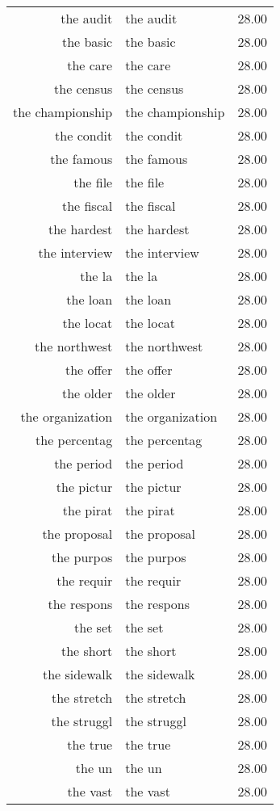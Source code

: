 \begin{table}[ht]
\begin{tabular}{rlr}
  the audit & the audit & 28.00 \\ 
  the basic & the basic & 28.00 \\ 
  the care & the care & 28.00 \\ 
  the census & the census & 28.00 \\ 
  the championship & the championship & 28.00 \\ 
  the condit & the condit & 28.00 \\ 
  the famous & the famous & 28.00 \\ 
  the file & the file & 28.00 \\ 
  the fiscal & the fiscal & 28.00 \\ 
  the hardest & the hardest & 28.00 \\ 
  the interview & the interview & 28.00 \\ 
  the la & the la & 28.00 \\ 
  the loan & the loan & 28.00 \\ 
  the locat & the locat & 28.00 \\ 
  the northwest & the northwest & 28.00 \\ 
  the offer & the offer & 28.00 \\ 
  the older & the older & 28.00 \\ 
  the organization & the organization & 28.00 \\ 
  the percentag & the percentag & 28.00 \\ 
  the period & the period & 28.00 \\ 
  the pictur & the pictur & 28.00 \\ 
  the pirat & the pirat & 28.00 \\ 
  the proposal & the proposal & 28.00 \\ 
  the purpos & the purpos & 28.00 \\ 
  the requir & the requir & 28.00 \\ 
  the respons & the respons & 28.00 \\ 
  the set & the set & 28.00 \\ 
  the short & the short & 28.00 \\ 
  the sidewalk & the sidewalk & 28.00 \\ 
  the stretch & the stretch & 28.00 \\ 
  the struggl & the struggl & 28.00 \\ 
  the true & the true & 28.00 \\ 
  the un & the un & 28.00 \\ 
  the vast & the vast & 28.00 \\ 

\end{tabular}
\end{table}

